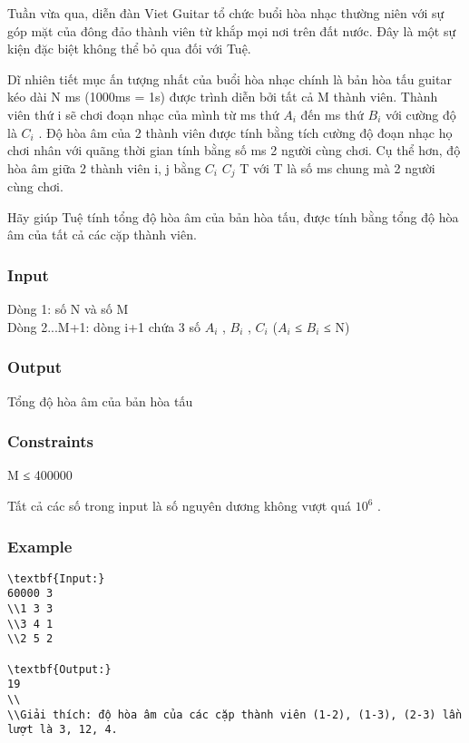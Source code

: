 



   Tuần vừa qua, diễn đàn Viet Guitar tổ chức buổi hòa nhạc thường niên với sự góp mặt của đông đảo thành viên từ khắp mọi nơi trên đất nước. Đây là một sự kiện đặc biệt không thể bỏ qua đối với Tuệ.  

   Dĩ nhiên tiết mục ấn tượng nhất của buổi hòa nhạc chính là bản hòa tấu guitar kéo dài N ms (1000ms = 1s) được trình diễn bởi tất cả M thành viên. Thành viên thứ i sẽ chơi đoạn nhạc của mình từ ms thứ $A_{i}$   đến ms thứ $B_{i}$   với cường độ là $C_{i}$   . Độ hòa âm của 2 thành viên được tính bằng tích cường độ đoạn nhạc họ chơi nhân với quãng thời gian tính bằng số ms 2 người cùng chơi. Cụ thể hơn, độ hòa âm giữa 2 thành viên i, j bằng $C_{i}$   $C_{j}$   T với T là số ms chung mà 2 người cùng chơi.  

   Hãy giúp Tuệ tính tổng độ hòa âm của bản hòa tấu, được tính bằng tổng độ hòa âm của tất cả các cặp thành viên.  

\subsubsection{   Input  }

   Dòng 1: số N và số M   
\\   Dòng 2...M+1: dòng i+1 chứa 3 số $A_{i}$   , $B_{i}$   , $C_{i}$   ($A_{i}$   ≤ $B_{i}$   ≤ N)  

\subsubsection{   Output  }

   Tổng độ hòa âm của bản hòa tấu  

\subsubsection{   Constraints  }

   M ≤ 400000  

   Tất cả các số trong input là số nguyên dương không vượt quá $10^{6}$   .  

\subsubsection{   Example  }
\begin{verbatim}
\textbf{Input:}
60000 3
\\1 3 3
\\3 4 1
\\2 5 2

\textbf{Output:}
19
\\
\\Giải thích: độ hòa âm của các cặp thành viên (1-2), (1-3), (2-3) lần lượt là 3, 12, 4. \end{verbatim}
